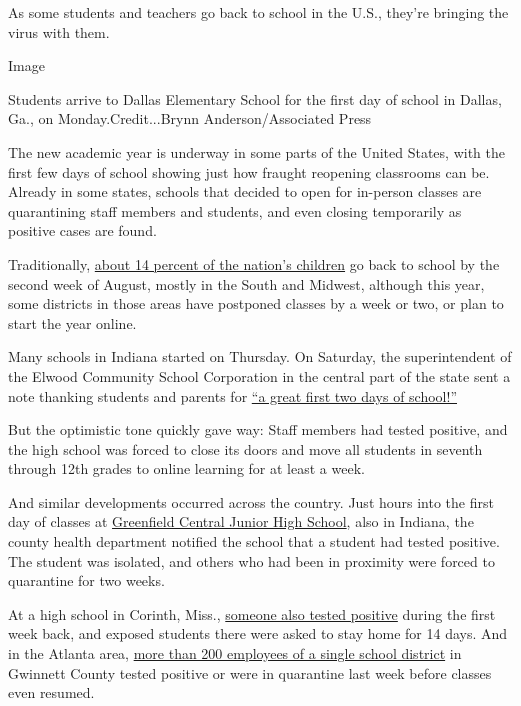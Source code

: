 As some students and teachers go back to school in the U.S., they're
bringing the virus with them.

Image

Students arrive to Dallas Elementary School for the first day of school
in Dallas, Ga., on Monday.Credit...Brynn Anderson/Associated Press

The new academic year is underway in some parts of the United States,
with the first few days of school showing just how fraught reopening
classrooms can be. Already in some states, schools that decided to open
for in-person classes are quarantining staff members and students, and
even closing temporarily as positive cases are found.

Traditionally,
\href{https://www.pewresearch.org/fact-tank/2019/08/14/back-to-school-dates-u-s/}{about
14 percent of the nation's children} go back to school by the second
week of August, mostly in the South and Midwest, although this year,
some districts in those areas have postponed classes by a week or two,
or plan to start the year online.

Many schools in Indiana started on Thursday. On Saturday, the
superintendent of the Elwood Community School Corporation in the central
part of the state sent a note thanking students and parents for
\href{https://www.facebook.com/ElwoodCommunitySchools/photos/pcb.1875944365880857/1875944205880873/?type=3\&theater}{``a
great first two days of school!''}

But the optimistic tone quickly gave way: Staff members had tested
positive, and the high school was forced to close its doors and move all
students in seventh through 12th grades to online learning for at least
a week.

And similar developments occurred across the country. Just hours into
the first day of classes at
\href{https://www.nytimes.com/2020/08/01/us/schools-reopening-indiana-coronavirus.html}{Greenfield
Central Junior High School}, also in Indiana, the county health
department notified the school that a student had tested positive. The
student was isolated, and others who had been in proximity were forced
to quarantine for two weeks.

At a high school in Corinth, Miss.,
\href{https://www.facebook.com/corinthschooldistrict/?tn-str=k*F}{someone
also tested positive} during the first week back, and exposed students
there were asked to stay home for 14 days. And in the Atlanta area,
\href{https://www.ajc.com/news/atlanta-news/covid-cases-exposure-have-260-gwinnett-school-employees-not-working/RVZP4UFBPFHDNJJ73MNUFIKEPY/}{more
than 200 employees of a single school district} in Gwinnett County
tested positive or were in quarantine last week before classes even
resumed.

